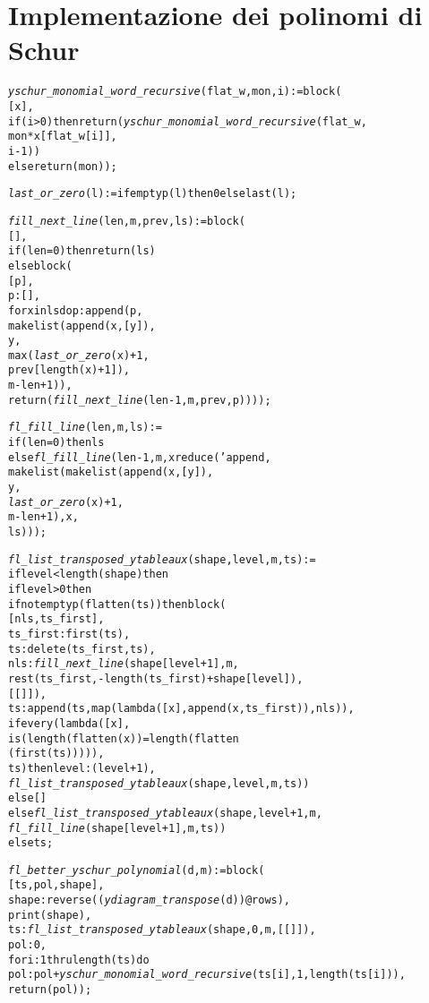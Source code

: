 \section{Implementazione dei polinomi di Schur}

\begin{alltt}
\emph{yschur\_monomial\_word\_recursive} (flat\_w, mon, i) := block (
  [x],
  if (i>0) then return (\emph{yschur\_monomial\_word\_recursive} (flat\_w,
                                                        mon*x[flat\_w[i]],
                                                        i-1))
  else return (mon));

\emph{last\_or\_zero} (l) := if emptyp (l) then 0 else last(l);

\emph{fill\_next\_line} (len, m, prev, ls) := block (
  [],
  if (len = 0) then return (ls)
  else block (
    [p],
    p : [],
    for x in ls do p : append (p,
                               makelist (append (x, [y]),
                               y,
                               max (\emph{last\_or\_zero} (x) + 1,
                                    prev[length (x)+1]),
                               m - len + 1)),
    return (\emph{fill\_next\_line} (len - 1, m, prev, p))));


\emph{fl\_fill\_line} (len, m, ls) :=
if (len=0) then ls
else \emph{fl\_fill\_line} (len-1, m, xreduce ('append, 
                                       makelist (makelist (append (x, [y]),
                                                 y,
                                                 \emph{last\_or\_zero} (x) + 1,
                                                 m - len +1), x,
                                                 ls)));

\emph{fl\_list\_transposed\_ytableaux} (shape, level, m, ts) :=
if level < length (shape) then
  if level > 0 then
    if not emptyp (flatten (ts)) then block (
      [nls,ts\_first],
      ts\_first : first (ts),
      ts : delete (ts\_first, ts),
      nls : \emph{fill\_next\_line} (shape [level+1], m,
                            rest (ts\_first, -length(ts\_first)+shape[level]),
                            [[]]),
      ts : append (ts, map (lambda ([x], append (x, ts\_first)), nls)),
      if every (lambda ([x],
                        is (length (flatten (x)) = length (flatten
                        (first (ts))))),
                ts) then level : (level + 1),
      \emph{fl\_list\_transposed\_ytableaux} (shape, level, m, ts))
    else []
  else \emph{fl\_list\_transposed\_ytableaux} (shape, level + 1, m,
                                     \emph{fl\_fill\_line} (shape[level + 1], m, ts))
else ts;

\emph{fl\_better\_yschur\_polynomial} (d, m) := block (
  [ts, pol, shape],
  shape : reverse ((\emph{ydiagram\_transpose} (d))@rows),
  print (shape),
  ts : \emph{fl\_list\_transposed\_ytableaux} (shape, 0, m, [[]]),
  pol : 0,
  for i : 1 thru length (ts) do
    pol : pol + \emph{yschur\_monomial\_word\_recursive} (ts[i], 1, length (ts[i])),
  return (pol));
\end{alltt}

